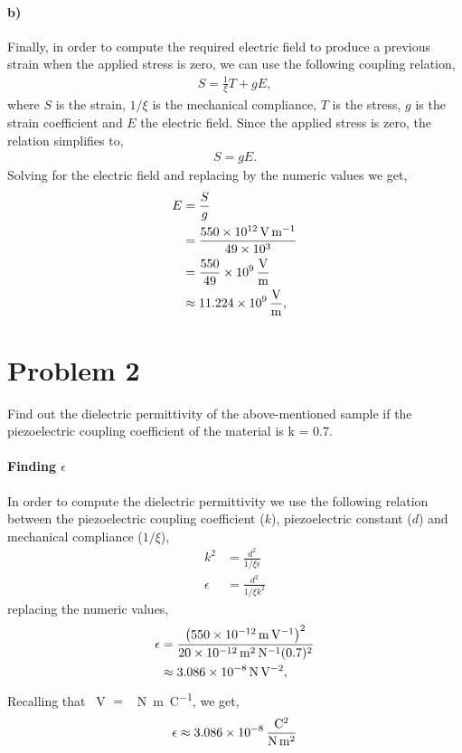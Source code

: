 \documentclass[../main.tex]{subfiles}
\begin{document}
\paragraph{b)}\label{par:1.b} Finally, in order to compute the required electric field to produce a previous strain when the applied stress is zero, we can use the following coupling relation,
\begin{align*}
    S = \frac{1}{\xi}T + g E,
\end{align*}
where $S$ is the strain, $1/\xi$ is the mechanical compliance, $T$ is the stress, $g$ is the strain coefficient and $E$ the electric field.
Since the applied stress is zero, the relation simplifies to,
\begin{align*}
    S = g E.
\end{align*}
Solving for the electric field and replacing by the numeric values we get,
\begin{align*}
    E &= \frac{S}{g} \\
      &= \frac{\SI{550d12}{\volt\per\meter}}{\num{49d3}} \\
      &= \frac{550}{49}\times\SI[per-mode=fraction]{d9}{\volt\per\meter} \\
      &\approx \SI[per-mode=fraction]{11.224d9}{\volt\per\meter}, 
\end{align*}


\section{Problem 2}

Find out the dielectric permittivity of the above-mentioned sample if the piezoelectric coupling coefficient of the material is k = \num{0.7}.

\paragraph{Finding $\epsilon$} In order to compute the dielectric permittivity we use the following relation between the piezoelectric coupling coefficient ($k$), piezoelectric constant ($d$) and mechanical compliance ($1/\xi$),
\begin{align*}
    k^2 &= \frac{d^2}{1/\xi\epsilon} \\
\epsilon &= \frac{d^2}{1/\xi k^2}
\end{align*}
replacing the numeric values,
\begin{align*}
    \epsilon &= \frac{\left(\SI{550d-12}{\meter\per\volt}\right)^2}{\SI{20d-12}{\meter\squared\per\newton} (0.7)^2} \\
             &\approx \SI{3.086d-8}{\newton\per\volt\squared},
\end{align*}
Recalling that \SI{}{\volt} $=$ \SI{}{\newton\meter\per\coulomb}, we get,
\begin{gather*}
    \epsilon\approx \SI[per-mode=fraction]{3.086d-8}{\coulomb\squared\per\newton\per\meter\squared}
\end{gather*}
\end{document}

